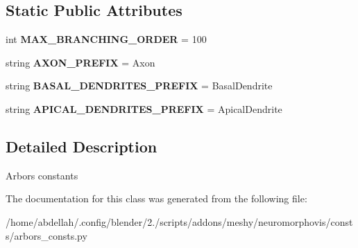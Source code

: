 \subsection*{Static Public Attributes}
\begin{DoxyCompactItemize}
\item 
int {\bfseries M\+A\+X\+\_\+\+B\+R\+A\+N\+C\+H\+I\+N\+G\+\_\+\+O\+R\+D\+ER} = 100\hypertarget{classmeshy_1_1neuromorphovis_1_1consts_1_1arbors__consts_1_1Arbors_a96e0f585f3af7f59a04bb6714a120ff7}{}\label{classmeshy_1_1neuromorphovis_1_1consts_1_1arbors__consts_1_1Arbors_a96e0f585f3af7f59a04bb6714a120ff7}

\item 
string {\bfseries A\+X\+O\+N\+\_\+\+P\+R\+E\+F\+IX} = \textquotesingle{}Axon\textquotesingle{}\hypertarget{classmeshy_1_1neuromorphovis_1_1consts_1_1arbors__consts_1_1Arbors_a985ebf3653f1987cea90a0ff07e277a8}{}\label{classmeshy_1_1neuromorphovis_1_1consts_1_1arbors__consts_1_1Arbors_a985ebf3653f1987cea90a0ff07e277a8}

\item 
string {\bfseries B\+A\+S\+A\+L\+\_\+\+D\+E\+N\+D\+R\+I\+T\+E\+S\+\_\+\+P\+R\+E\+F\+IX} = \textquotesingle{}Basal\+Dendrite\textquotesingle{}\hypertarget{classmeshy_1_1neuromorphovis_1_1consts_1_1arbors__consts_1_1Arbors_ad709d09f7f7a079ae0b8efe0a39dfce5}{}\label{classmeshy_1_1neuromorphovis_1_1consts_1_1arbors__consts_1_1Arbors_ad709d09f7f7a079ae0b8efe0a39dfce5}

\item 
string {\bfseries A\+P\+I\+C\+A\+L\+\_\+\+D\+E\+N\+D\+R\+I\+T\+E\+S\+\_\+\+P\+R\+E\+F\+IX} = \textquotesingle{}Apical\+Dendrite\textquotesingle{}\hypertarget{classmeshy_1_1neuromorphovis_1_1consts_1_1arbors__consts_1_1Arbors_ac3a6fd27fbcbf91aa6d2f812601a9d13}{}\label{classmeshy_1_1neuromorphovis_1_1consts_1_1arbors__consts_1_1Arbors_ac3a6fd27fbcbf91aa6d2f812601a9d13}

\end{DoxyCompactItemize}


\subsection{Detailed Description}


\begin{DoxyVerb}Arbors constants
\end{DoxyVerb}
 

The documentation for this class was generated from the following file\+:\begin{DoxyCompactItemize}
\item 
/home/abdellah/.\+config/blender/2./scripts/addons/meshy/neuromorphovis/consts/arbors\+\_\+consts.\+py\end{DoxyCompactItemize}

